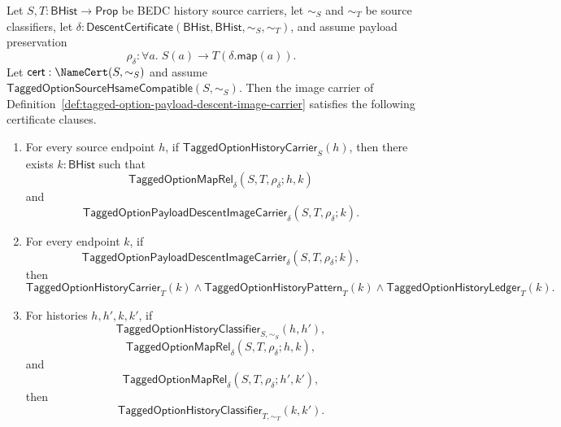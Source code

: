 \begin{theorem}
\label{thm:tagged-option-payload-descent-image-certificate}
Let $S,T:\mathsf{BHist}\to\mathsf{Prop}$ be BEDC history source carriers, let
$\sim_S$ and $\sim_T$ be source classifiers, let
$\delta:\mathsf{DescentCertificate}(\mathsf{BHist},\mathsf{BHist},\sim_S,\sim_T)$,
and assume payload preservation
$$
\rho_{\delta}:\forall a.\;S(a)\to T(\delta.\mathsf{map}(a)).
$$
Let $\mathsf{cert}:\NameCert(S,\sim_S)$ and assume
$\mathsf{TaggedOptionSourceHsameCompatible}(S,\sim_S)$. Then the image carrier
of Definition~\ref{def:tagged-option-payload-descent-image-carrier} satisfies
the following certificate clauses.
\begin{enumerate}
  \item For every source endpoint $h$, if
  $\mathsf{TaggedOptionHistoryCarrier}_S(h)$, then there exists
  $k:\mathsf{BHist}$ such that
  $$
  \mathsf{TaggedOptionMapRel}_{\delta}(S,T,\rho_{\delta};h,k)
  $$
  and
  $$
  \mathsf{TaggedOptionPayloadDescentImageCarrier}_{\delta}
  (S,T,\rho_{\delta};k).
  $$
  \item For every endpoint $k$, if
  $$
  \mathsf{TaggedOptionPayloadDescentImageCarrier}_{\delta}
  (S,T,\rho_{\delta};k),
  $$
  then
  $$
  \mathsf{TaggedOptionHistoryCarrier}_T(k)\land
  \mathsf{TaggedOptionHistoryPattern}_T(k)\land
  \mathsf{TaggedOptionHistoryLedger}_T(k).
  $$
  \item For histories $h,h',k,k'$, if
  $$
  \mathsf{TaggedOptionHistoryClassifier}_{S,\sim_S}(h,h'),
  $$
  $$
  \mathsf{TaggedOptionMapRel}_{\delta}(S,T,\rho_{\delta};h,k),
  $$
  and
  $$
  \mathsf{TaggedOptionMapRel}_{\delta}(S,T,\rho_{\delta};h',k'),
  $$
  then
  $$
  \mathsf{TaggedOptionHistoryClassifier}_{T,\sim_T}(k,k').
  $$
\end{enumerate}
\end{theorem}
